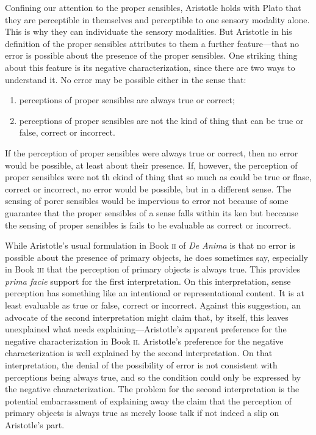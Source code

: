 \documentclass[12pt]{article}
\begin{document}
Confining our attention to the proper sensibles, Aristotle holds with Plato that they are perceptible in themselves and perceptible to one sensory modality alone. This is why they can individuate the sensory modalities. But Aristotle in his definition of the proper sensibles attributes to them a further feature---that no error is possible about the presence of the proper sensibles. One striking thing about this feature is its negative characterization, since there are two ways to understand it. No error may be possible either in the sense that:
\begin{enumerate}
	\item perceptions of proper sensibles are always true or correct;
	\item perceptions of proper sensibles are not the kind of thing that can be true or false, correct or incorrect.
\end{enumerate}
If the perception of proper sensibles were always true or correct, then no error would be possible, at least about their presence. If, however, the perception of proper sensibles were not th ekind of thing that so much as could be true or flase, correct or incorrect, no error would be possible, but in a different sense. The sensing of porer sensibles would be impervious to error not because of some guarantee that the proper sensibles of a sense falls within its ken but beccause the sensing of proper sensibles is fails to be evaluable as correct or incorrect.

While Aristotle's usual formulation in Book \textsc{ii} of \emph{De Anima} is that no error is possible about the presence of primary objects, he does sometimes say, especially in Book \textsc{iii} that the perception of primary objects is always true. This provides \emph{prima facie} support for the first interpretation. On this interpretation, sense perception has something like an intentional or representational content. It is at least evaluable as true or false, correct or incorrect. Against this suggestion, an advocate of the second interpretation might claim that, by itself, this leaves unexplained what needs explaining---\-Aristotle's apparent preference for the negative characterization in Book \textsc{ii}. Aristotle's preference for the negative characterization is well explained by the second interpretation. On that interpretation, the denial of the possibility of error is not consistent with perceptions being always true, and so the condition could only be expressed by the negative characterization. The problem for the second interpretation is the potential embarrassment of explaining away the claim that the perception of primary objects is always true as merely loose talk if not indeed a slip on Aristotle's part.
\end{document}
